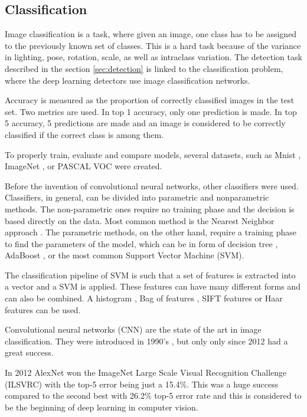 \documentclass[a4paper,11pt,titlepage,twoside]{article}
\numberwithin{figure}{section}
\begin{document}
\subsection{Classification}

Image classification is a task, where given an image, one class has to be assigned to the previously known set of classes. This is a hard task because of the variance in lighting, pose, rotation, scale, as well as intraclass variation. The detection task described in the section \ref{sec:detection} is linked to the classification problem, where the deep learning detectors use image classification networks.

Accuracy is measured as the proportion of correctly classified images in the test set. Two metrics are used. In top 1 accuracy, only one prediction is made. In top 5 accuracy, 5 predictions are made and an image is considered to be correctly classified if the correct class is among them.

To properly train, evaluate and compare models, several datasets, such as Mnist \cite{lecun-mnisthandwrittendigit-2010}, ImageNet \cite{deng2009imagenet}, or PASCAL VOC \cite{Everingham10} were created.

Before the invention of convolutional neural networks, other classifiers were used. Classifiers, in general, can be divided into parametric and nonparametric methods. The non-parametric ones require no training phase and the decision is based directly on the data. Most common method is the Nearest Neighbor approach \cite{boiman2008defense, zhang2006svm}. The parametric methods, on the other hand, require a training phase to find the parameters of the model, which can be in form of decision tree \cite{bosch2007image}, AdaBoost \cite{opelt2004weak}, or the most common Support Vector Machine (SVM).

The classification pipeline of SVM is such that a set of features is extracted into a vector and a SVM is applied. These features can have many different forms and can also be combined. A histogram \cite{chapelle1999support}, Bag of features \cite{lazebnik2006beyond, nowak2006sampling}, SIFT features \cite{yang2009linear, bicego2006use} or Haar features \cite{munder2006experimental} can be used.

Convolutional neural networks (CNN) are the state of the art in image classification. They were introduced in 1990's \cite{lecun1989backpropagation}, but only only since 2012 had a great success.

In 2012 AlexNet \cite{krizhevsky2012imagenet} won the ImageNet Large Scale Visual Recognition Challenge (ILSVRC) with the top-5 error being just a 15.4\%. This was a huge success compared to the second best with 26.2\% top-5 error rate and this is considered to be the beginning of deep learning in computer vision. 
\end{document}
